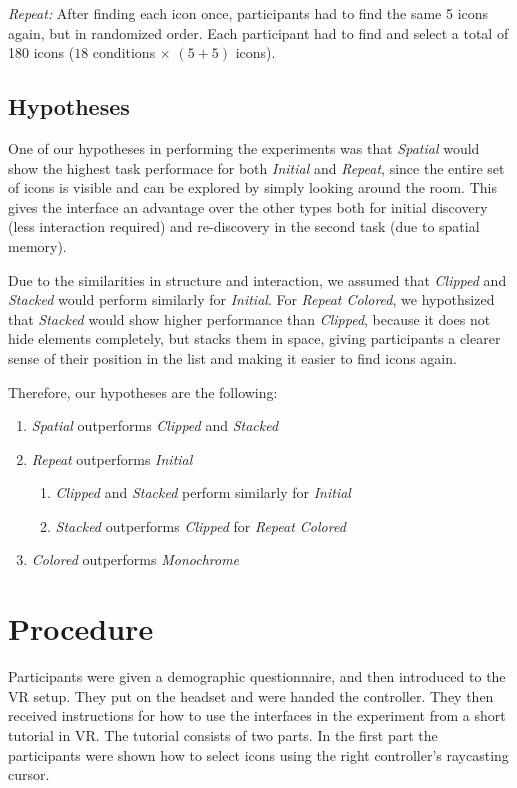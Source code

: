 \documentclass{tufte-book} %
\begin{document}
\emph{Repeat:} After finding each icon once, participants had to find the same 5 icons again, but in randomized order. Each participant had to find and select a total of 180 icons ($18$ conditions $\times$ $(5 + 5) $ icons).

\subsection{Hypotheses}
One of our hypotheses in performing the experiments was that \emph{Spatial} would show the highest task performace for both \emph{Initial} and \emph{Repeat}, since the entire set of icons is visible and can be explored by simply looking around the room. This gives the interface an advantage over the other types both for initial discovery (less interaction required) and re-discovery in the second task (due to spatial memory).

Due to the similarities in structure and interaction, we assumed that \emph{Clipped} and \emph{Stacked} would perform similarly for \emph{Initial}.
For \emph{Repeat Colored}, we hypothsized that \emph{Stacked} would show higher performance than \emph{Clipped}, because it does not hide elements completely, but stacks them in space, giving participants a clearer sense of their position in the list and making it easier to find icons again.

Therefore, our hypotheses are the following:

\begin{enumerate}[label=H\arabic*. , wide=0.5em,  leftmargin=*]
  \item \emph{Spatial} outperforms \emph{Clipped} and \emph{Stacked}
  \item \emph{Repeat} outperforms \emph{Initial}
  \begin{enumerate}[label=H2.\arabic*. , wide=0.5em,  leftmargin=*]
    \item \emph{Clipped} and \emph{Stacked} perform similarly for \emph{Initial}
    \item \emph{Stacked} outperforms \emph{Clipped} for \emph{Repeat Colored}
  \end{enumerate}
  \item \emph{Colored} outperforms \emph{Monochrome}
\end{enumerate}

\section{Procedure}
Participants were given a demographic questionnaire, and then introduced to the VR setup. They put on the headset and were handed the controller. They then received instructions for how to use the interfaces in the experiment from a short tutorial in VR. The tutorial consists of two parts.
In the first part the participants were shown how to select icons using the right controller's raycasting cursor.
\end{document}

